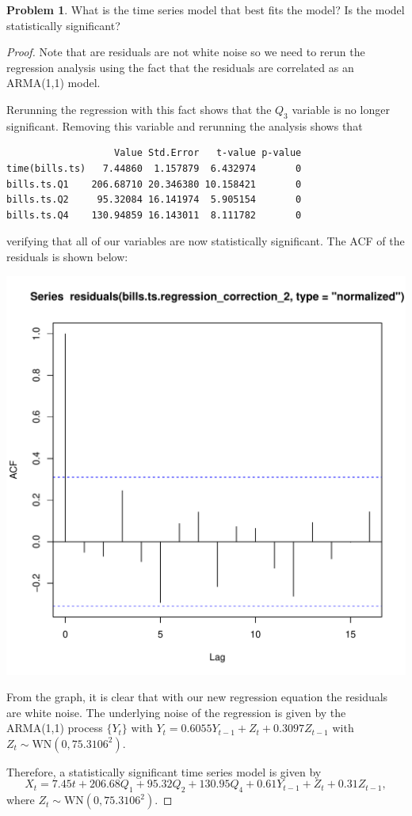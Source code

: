 \documentclass[12pt]{article}
\theoremstyle{definition}
\newtheorem{problem}{Problem}
\begin{document}
\begin{problem}
  What is the time series model that best fits the model? Is the model statistically significant?
\end{problem}

\begin{proof}

Note that are residuals are not white noise so we need to rerun the regression
analysis using the fact that the residuals are correlated as an ARMA(1,1) model.

Rerunning the regression with this fact shows that the $Q_3$ variable is no longer
significant. Removing this variable and rerunning the analysis shows that

\begin{verbatim}
                   Value Std.Error   t-value p-value
time(bills.ts)   7.44860  1.157879  6.432974       0
bills.ts.Q1    206.68710 20.346380 10.158421       0
bills.ts.Q2     95.32084 16.141974  5.905154       0
bills.ts.Q4    130.94859 16.143011  8.111782       0

\end{verbatim}

verifying that all of our variables are now statistically significant. The ACF
of the residuals is shown below:

\begin{center}
  \includegraphics[scale=0.5]{new_residuals_acf.pdf}
\end{center}
From the graph, it is clear that with our new regression equation the residuals are white noise.
The underlying noise of the regression is given by the ARMA(1,1) process $\{Y_t\}$
with $Y_t = 0.6055 Y_{t-1} + Z_t + 0.3097Z_{t-1}$ with $Z_t \sim \text{WN}(0, 75.3106^2)$.

Therefore, a statistically significant time series model is given by
\[
  X_t = 7.45t + 206.68Q_1 + 95.32Q_2 + 130.95Q_4 + 0.61 Y_{t-1} + Z_t + 0.31Z_{t-1},
\]
where $Z_t \sim \text{WN}(0, 75.3106^2)$.
\end{proof}
\end{document}
